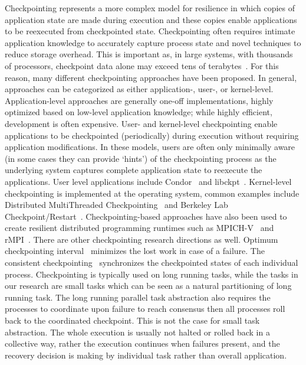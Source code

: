 \documentclass{sig-alternate}
\begin{document}
Checkpointing represents a more complex model for resilience in which copies of application state are made during execution and these copies enable applications to be reexecuted from checkpointed state. Checkpointing often requires intimate application knowledge to accurately capture process state and novel techniques to reduce storage overhead. This is important as, in large systems, with thousands of processors, checkpoint data alone may exceed tens of terabytes~\cite{diskless2010}. For this reason, many different checkpointing approaches have been proposed. In general, approaches can be categorized as either application-, user-, or kernel-level. Application-level approaches are generally one-off implementations, highly optimized based on low-level application knowledge; while highly efficient, development is often expensive.
User- and kernel-level checkpointing enable applications to be checkpointed (periodically) during execution without requiring application modifications. In these models, users are often only minimally aware (in some cases they can provide `hints') of the checkpointing process as the underlying system captures complete application state to reexecute the applications. User level applications include Condor~\cite{condor1988} and libckpt~\cite{libckpt1994}. Kernel-level checkpointing is implemented at the operating system, common examples include Distributed MultiThreaded Checkpointing~\cite{dmtcp2009} and Berkeley Lab Checkpoint/Restart~\cite{blcr2006}. Checkpointing-based approaches have also been used to create resilient distributed programming runtimes such as MPICH-V~\cite{bosilca02mpichv} and rMPI~\cite{ferreira2011rmpi}.
There are other checkpointing research directions as well.
Optimum checkpointing interval~\cite{young1974first, daly2006higher} minimizes the lost work in case of a failure.
The consistent checkpointing~\cite{elnozahy1992performance, chandy1985distributed} synchronizes the checkpointed states of each individual process.
Checkpointing is typically used on long running tasks, while the tasks in our research are small tasks which can be seen as a natural partitioning of long running task. The long running parallel task abstraction also requires the processes to coordinate upon failure to reach consensus then all processes roll back to the coordinated checkpoint. This is not the case for small task abstraction. The whole execution is usually not halted or rolled back in a collective way, rather the execution continues when failures present, and the recovery decision is making by individual task rather than overall application.
 
\end{document}
